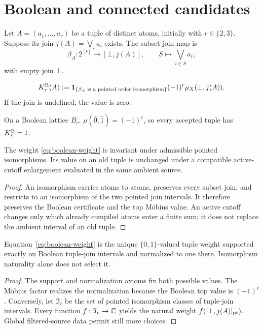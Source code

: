 \section{Boolean and connected candidates}
\label{sec:candidates}

Let \(A=(a_1,\ldots,a_r)\) be a tuple of distinct atoms, initially with
\(r\in\{2,3\}\).  Suppose its join \(j(A)=\bigvee_i a_i\) exists.  The
subset-join map is
\begin{equation}
 \beta_A:2^{[r]}\longrightarrow[\bot,j(A)],
 \qquad S\longmapsto\bigvee_{i\in S}a_i,
 \label{eq:beta}
\end{equation}
with empty join \(\bot\).

\begin{definition}
\begin{equation}
 K^{\mathrm B}_r(A)
 :=\mathbf 1_{\{\beta_A\text{ is a pointed order isomorphism}\}}
   (-1)^r\mu_X(\bot,j(A)).
 \label{eq:boolean-weight}
\end{equation}
If the join is undefined, the value is zero.
\end{definition}

On a Boolean lattice \(B_r\),
\(
 \mu(\hat0,\hat1)=(-1)^r
\), so every accepted tuple has \(K^{\mathrm B}_r=1\).

\begin{proposition}
\label{prop:boolean-natural}
The weight \eqref{eq:boolean-weight} is invariant under admissible pointed
isomorphisms.  Its value on an old tuple is unchanged under a compatible
active-cutoff enlargement evaluated in the same ambient source.
\end{proposition}
\begin{proof}
An isomorphism carries atoms to atoms, preserves every subset join, and
restricts to an isomorphism of the two pointed join intervals.  It therefore
preserves the Boolean certificate and the top M{\"o}bius value.  An active
cutoff changes only which already compiled atoms enter a finite sum; it does
not replace the ambient interval of an old tuple.
\end{proof}

\begin{proposition}
\label{prop:conditional-unique}
Equation~\eqref{eq:boolean-weight} is the unique \(\{0,1\}\)-valued tuple
weight supported exactly on Boolean tuple-join intervals and normalized to
one there.  Isomorphism naturality alone does not select it.
\end{proposition}
\begin{proof}
The support and normalization axioms fix both possible values.  The M{\"o}bius
factor realizes the normalization because the Boolean top value is
\((-1)^r\).  Conversely, let \(\mathfrak I_r\) be the set of pointed
isomorphism classes of tuple-join intervals.  Every function
\(f:\mathfrak I_r\to\mathbb C\) yields the natural weight
\(
 f([\bot,j(A)]_{\rm pt})
\).  Global filtered-source data permit still more choices.
\end{proof}

